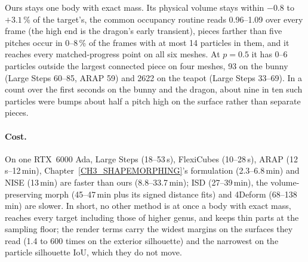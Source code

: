 Ours stays one body with exact mass. Its physical volume stays within $-0.8$ to $+3.1$\,\% of the target's, the common
occupancy routine reads 0.96--1.09 over every frame (the high end is the dragon's early transient), pieces farther than
five pitches occur in 0--8\,\% of the frames with at most 14 particles in them, and it reaches every matched-progress
point on all six meshes. At $p=0.5$ it has 0--6 particles outside the largest connected piece on four meshes, 93 on the
bunny (Large Steps 60--85, ARAP 59) and 2622 on the teapot (Large Steps 33--69). In a count over the first seconds on the
bunny and the dragon, about nine in ten such particles were bumps about half a pitch high on the surface rather than
separate pieces.

\paragraph{Cost.} On one RTX~6000 Ada, Large Steps (18--53\,s), FlexiCubes (10--28\,s), ARAP (12\,s--12\,min),
Chapter~\ref{CH3_SHAPEMORPHING}'s formulation (2.3--6.8\,min) and NISE (13\,min) are faster than ours (8.8--33.7\,min);
ISD (27--39\,min), the volume-preserving morph (45--47\,min plus its signed distance fits) and 4Deform (68--138\,min) are
slower. In short, no other method is at once a body with exact mass, reaches every target including those of higher
genus, and keeps thin parts at the sampling floor; the render terms carry the widest margins on the surfaces they read
(1.4 to 600 times on the exterior silhouette) and the narrowest on the particle silhouette IoU, which they do not move.

